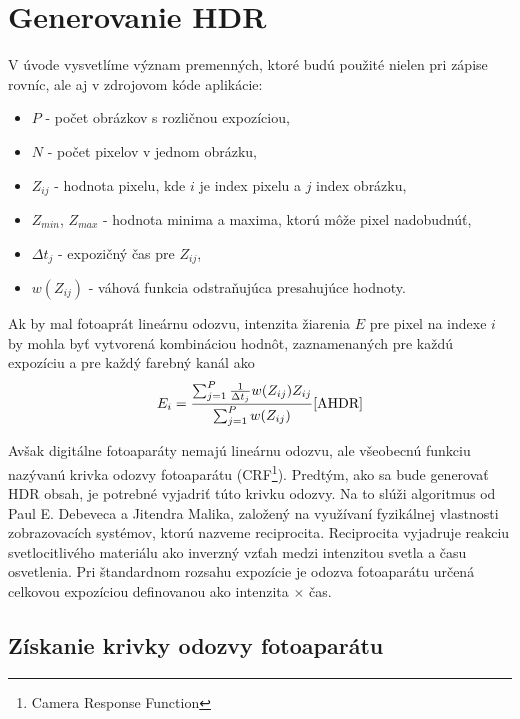 \section{Generovanie HDR}
\label{sec:Theory-Generating}

V úvode vysvetlíme význam premenných, ktoré budú použité nielen pri zápise rovníc, ale aj v zdrojovom
kóde aplikácie:
\begin{itemize}
    \item $P$ - počet obrázkov s rozličnou expozíciou,
    \item $N$ - počet pixelov v jednom obrázku,
    \item $Z_{ij}$ - hodnota pixelu, kde $i$ je index pixelu a $j$ index obrázku,
    \item $Z_{min}$, $Z_{max}$ - hodnota minima a maxima, ktorú môže pixel nadobudnúť,
    \item $\Delta t_{j}$ - expozičný čas pre $Z_{ij}$,
    \item $w(Z_{ij})$ - váhová funkcia odstraňujúca presahujúce hodnoty.
\end{itemize}

Ak by mal fotoaprát lineárnu odozvu, intenzita žiarenia $E$ pre pixel na indexe $i$ by mohla byť 
vytvorená kombináciou hodnôt, zaznamenaných pre každú expozíciu a pre každý farebný kanál ako
\begin{equation}
    E_{i} = \frac{
            \sum_{j=1}^{P}
            \frac{1}{\Delta t_{j}}
            w(Z_{ij})Z_{ij}
        }{
            \sum_{j=1}^{P}
            w(Z_{ij})
        }
    \cite{AHDR}
\end{equation}

Avšak digitálne fotoaparáty nemajú lineárnu odozvu, ale všeobecnú funkciu nazývanú krivka odozvy
fotoaparátu (CRF\footnote{Camera Response Function}). Predtým, ako sa bude generovať HDR obsah,
je potrebné vyjadriť túto krivku odozvy. Na to slúži algoritmus od Paul E. Debeveca a Jitendra Malika, 
založený na využívaní fyzikálnej vlastnosti zobrazovacích systémov, ktorú nazveme reciprocita.
Reciprocita vyjadruje reakciu svetlocitlivého materiálu ako inverzný vzťah medzi intenzitou svetla 
a času osvetlenia. Pri štandardnom rozsahu expozície je odozva fotoaparátu určená celkovou expozíciou 
definovanou ako intenzita $\times$ čas. \cite{AHDR}

\subsection{Získanie krivky odozvy fotoaparátu} 

